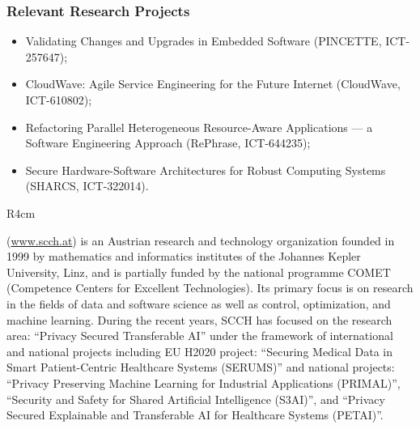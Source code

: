 \documentclass[a4paper,11pt]{article}
\begin{document}
\subsubsection*{Relevant Research Projects}
\begin{itemize}
\item
Validating Changes and Upgrades in Embedded Software (PINCETTE, ICT-257647);
\item
CloudWave: Agile Service Engineering for the Future Internet (CloudWave, ICT-610802);
\item
Refactoring Parallel Heterogeneous Resource-Aware Applications --- a Software Engineering Approach (RePhrase, ICT-644235);
\item
Secure Hardware-Software Architectures for Robust Computing Systems (SHARCS, ICT-322014).

\end{itemize}


\begin{wrapfigure}{R}{4cm}
\vspace{-2cm}
\hfill {}
\vspace{-1cm}
\end{wrapfigure}

\SCCH{} (\url{www.scch.at}) is an Austrian research and technology organization founded in 1999 by mathematics and informatics institutes of the Johannes Kepler University, Linz, and is partially funded by the national programme COMET (Competence Centers for Excellent Technologies). Its primary focus is on research in the fields of data and software science as well as control, optimization, and machine learning. During the recent years, SCCH has focused on the research area: ``Privacy Secured Transferable AI'' under the framework of international and national projects including EU H2020 project: ``Securing Medical Data in Smart Patient-Centric Healthcare Systems (SERUMS)'' and national projects: ``Privacy Preserving Machine Learning for Industrial Applications (PRIMAL)'', ``Security and Safety for Shared Artificial Intelligence (S3AI)'', and ``Privacy Secured Explainable and Transferable AI for Healthcare Systems (PETAI)''.  
\end{document}
